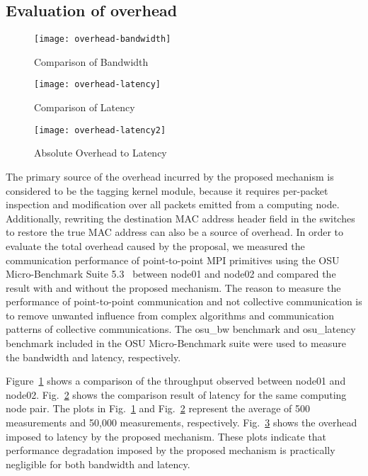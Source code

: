 \subsection{Evaluation of overhead}

\begin{figure}
    \centering
    \texttt{[image: overhead-bandwidth]}
    \caption{Comparison of Bandwidth}%
    \label{fig:overhead-bandwidth}
\end{figure}

\begin{figure}
    \centering
    \texttt{[image: overhead-latency]}
    \caption{Comparison of Latency}%
    \label{fig:overhead-latency}
\end{figure}

\begin{figure}
    \centering
    \texttt{[image: overhead-latency2]}
    \caption{Absolute Overhead to Latency}
    \label{fig:overhead-latency-2}
\end{figure}

The primary source of the overhead incurred by the proposed mechanism is
considered to be the tagging kernel module, because it requires
per-packet inspection and modification over all packets emitted from a
computing node. Additionally, rewriting the destination MAC address
header field in the switches to restore the true MAC address can also be
a source of overhead. In order to evaluate the total overhead caused by
the proposal, we measured the communication performance of
point-to-point MPI primitives using the OSU Micro-Benchmark Suite
5.3~\autocite{OhioStateUniversity2016} between node01 and node02 and
compared the result with and without the proposed mechanism. The reason
to measure the performance of point-to-point communication and not
collective communication is to remove unwanted influence from complex
algorithms and communication patterns of collective communications. The
osu\_bw benchmark and osu\_latency benchmark included in the OSU
Micro-Benchmark suite were used to measure the bandwidth and latency,
respectively.

Figure~\ref{fig:overhead-bandwidth} shows a comparison of the throughput
observed between node01 and node02. Fig.~\ref{fig:overhead-latency}
shows the comparison result of latency for the same computing node pair.
The plots in Fig.~\ref{fig:overhead-bandwidth} and
Fig.~\ref{fig:overhead-latency} represent the average of 500
measurements and 50,000 measurements, respectively.
Fig.~\ref{fig:overhead-latency-2} shows the overhead imposed to latency
by the proposed mechanism. These plots indicate that performance
degradation imposed by the proposed mechanism is practically negligible
for both bandwidth and latency.

